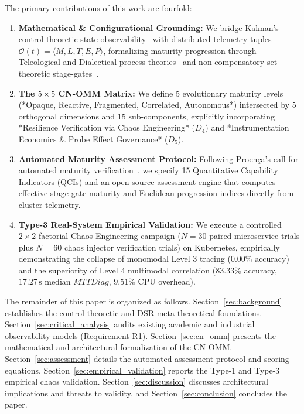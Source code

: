 The primary contributions of this work are fourfold:
\begin{enumerate}[leftmargin=*, nosep]
    \item \textbf{Mathematical \& Configurational Grounding:} We bridge Kalman's control-theoretic state observability~\cite{kalman_1960} with distributed telemetry tuples $\mathcal{O}(t) = \langle M, L, T, E, P \rangle$, formalizing maturity progression through Teleological and Dialectical process theories~\cite{vandeven_1995} and non-compensatory set-theoretic stage-gates~\cite{fiss_2011, lasrado_2015}.
    \item \textbf{The $5 \times 5$ CN-OMM Matrix:} We define 5 evolutionary maturity levels (*Opaque, Reactive, Fragmented, Correlated, Autonomous*) intersected by 5 orthogonal dimensions and 15 sub-components, explicitly incorporating *Resilience Verification via Chaos Engineering* ($D_4$) and *Instrumentation Economics \& Probe Effect Governance* ($D_5$).
    \item \textbf{Automated Maturity Assessment Protocol:} Following Proen\c{c}a's call for automated maturity verification~\cite{proenca_2016_rcis}, we specify 15 Quantitative Capability Indicators (QCIs) and an open-source assessment engine that computes effective stage-gate maturity and Euclidean progression indices directly from cluster telemetry.
    \item \textbf{Type-3 Real-System Empirical Validation:} We execute a controlled $2\times2$ factorial Chaos Engineering campaign ($N=30$ paired microservice trials plus $N=60$ chaos injector verification trials) on Kubernetes, empirically demonstrating the collapse of monomodal Level 3 tracing ($0.00\%$ accuracy) and the superiority of Level 4 multimodal correlation ($83.33\%$ accuracy, $17.27\,\text{s}$ median $MTTDiag$, $9.51\%$ CPU overhead).
\end{enumerate}

The remainder of this paper is organized as follows. Section~\ref{sec:background} establishes the control-theoretic and DSR meta-theoretical foundations. Section~\ref{sec:critical_analysis} audits existing academic and industrial observability models (Requirement R1). Section~\ref{sec:cn_omm} presents the mathematical and architectural formalization of the CN-OMM. Section~\ref{sec:assessment} details the automated assessment protocol and scoring equations. Section~\ref{sec:empirical_validation} reports the Type-1 and Type-3 empirical chaos validation. Section~\ref{sec:discussion} discusses architectural implications and threats to validity, and Section~\ref{sec:conclusion} concludes the paper.
